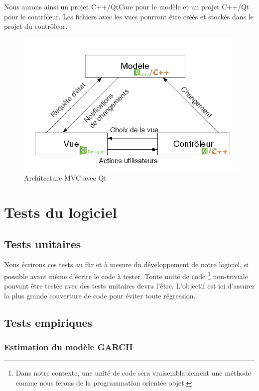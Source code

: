 \documentclass[a4paper,titlepage,french]{report}
\begin{document}
Nous aurons ainsi un projet C++/QtCore pour le modèle et un projet C++/Qt pour le contrôleur. Les fichiers avec les vues pourront être créés et stockés dans le projet du contrôleur.

\begin{figure}[h]
  	\center
  	\includegraphics[width=1\textwidth]{mvc.png}
  	\caption{Architecture MVC avec Qt}
    \label{fig:diagramme-mvc}
\end{figure}


\section{Tests du logiciel}

\subsection{Tests unitaires}

Nous écrirons ces tests au fûr et à mesure du développement de notre logiciel, si possible avant même d'écrire le code à tester.
Toute unité de code \footnote{Dans notre contexte, une unité de code sera vraisemblablement une méthode comme nous ferons de la programmation orientée objet.} non-triviale pouvant être testée avec des tests unitaires devra l'être.
L'objectif est ici d'assurer la plus grande couverture de code pour éviter toute régression.


\subsection{Tests empiriques}

\subsubsection{Estimation du modèle GARCH}
\end{document}
